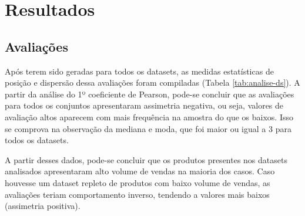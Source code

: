 \chapter{Resultados} \label{resultados}

\section{Avaliações}
Após terem sido geradas para todos os datasets, as medidas estatísticas de posição e dispersão dessa avaliações foram compiladas (Tabela \ref{tab:analise-ds}). A partir da análise do 1º coeficiente de Pearson, pode-se concluir que as avaliações para todos os conjuntos apresentaram assimetria negativa, ou seja, valores de avaliação altos aparecem com mais frequência na amostra do que os baixos. Isso se comprova na observação da mediana e moda, que foi maior ou igual a 3 para todos os datasets.

A partir desses dados, pode-se concluir que os produtos presentes nos datasets analisados apresentaram alto volume de vendas na maioria dos casos. Caso houvesse um dataset repleto de produtos com baixo volume de vendas, as avaliações teriam comportamento inverso, tendendo a valores mais baixos (assimetria positiva).

